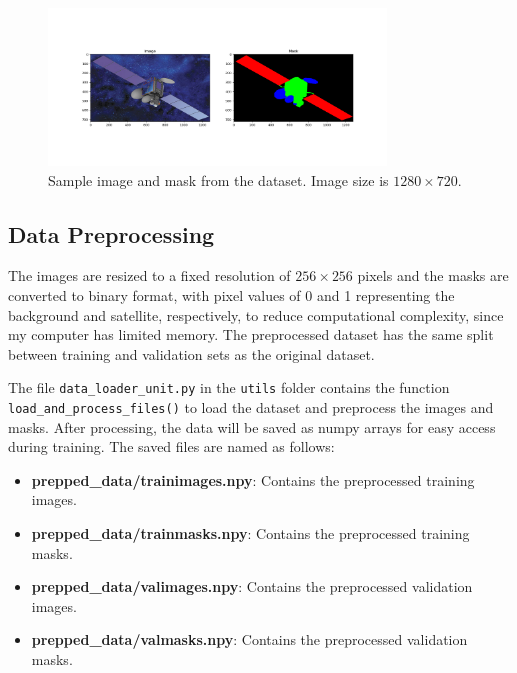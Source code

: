 \documentclass{article}
\begin{document}
\begin{figure}[h]
    \centering
    \includegraphics[width=0.8\textwidth]{../images/original_input_sample.png}
    \caption{Sample image and mask from the dataset. Image size is $1280 \times 720$.}
    \label{fig:original_dataset}
\end{figure}

\subsection{Data Preprocessing}

The images
are resized to a fixed resolution of $256 \times 256$ pixels and the masks are converted to binary format, with 
pixel values of 0 and 1 representing the background and satellite, respectively, to reduce computational
complexity, since my computer has limited memory. The preprocessed dataset has the same split between training 
and validation sets as the original dataset.
\vspace{1em}

The file \texttt{data\_loader\_unit.py} in the \texttt{utils} folder contains the function 
\texttt{load\_and\_process\_files()} to load the dataset and preprocess the images and masks. After processing, 
the data will be saved as numpy arrays for easy access during training. The saved files are named as follows:

\begin{itemize}
    \item \textbf{prepped\_data/trainimages.npy}: Contains the preprocessed training images.
    \item \textbf{prepped\_data/trainmasks.npy}: Contains the preprocessed training masks.
    \item \textbf{prepped\_data/valimages.npy}: Contains the preprocessed validation images.
    \item \textbf{prepped\_data/valmasks.npy}: Contains the preprocessed validation masks.
\end{itemize}
\vspace{1em}
\end{document}
